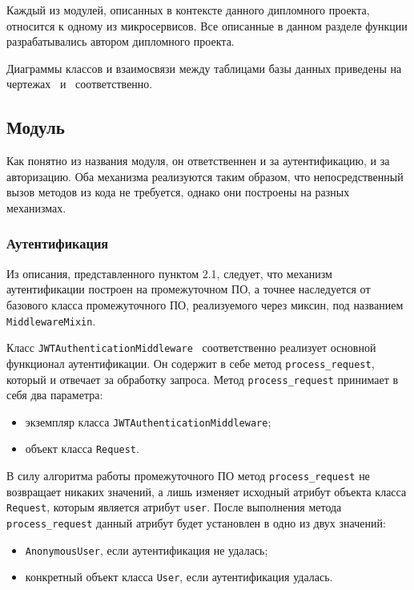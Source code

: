 Каждый из модулей, описанных в контексте данного дипломного проекта, относится к одному из микросервисов.
Все описанные в данном разделе функции разрабатывались автором дипломного проекта.

Диаграммы классов и взаимосвязи между таблицами базы данных приведены на чертежах \seqIcdScheme\ и \seqGooseScheme\ соответственно. %

\subsection{Модуль \moduleAuth}\label{subsec:func:module-auth}
Как понятно из названия модуля, он ответственнен и за аутентификацию, и за авторизацию.
Оба механизма реализуются таким образом, что непосредственный вызов методов из кода не требуется, однако они построены на разных механизмах.

\subsubsection{Аутентификация}
Из описания, представленного пунктом 2.1, следует, что механизм аутентификации построен на промежуточном ПО, а точнее наследуется
от базового класса промежуточного ПО, реализуемого через миксин, под названием \lstinline{MiddlewareMixin}. %

Класс \lstinline{JWTAuthenticationMiddleware} ~соответственно реализует основной функционал аутентификации.
Он содержит в себе метод \lstinline{process_request}, который и отвечает за обработку запроса.
Метод \lstinline{process_request} принимает в себя два параметра:
\begin{itemize}
    \item экземпляр класса \lstinline{JWTAuthenticationMiddleware};
    \item объект класса \lstinline{Request}.
\end{itemize}

В силу алгоритма работы промежуточного ПО метод \lstinline{process_request} не возвращает никаких значений,
а лишь изменяет исходный атрибут объекта класса \lstinline{Request}, которым является атрибут \lstinline{user}.
После выполнения метода \lstinline{process_request} данный атрибут будет установлен в одно из двух значений:
\begin{itemize}
    \item \lstinline{AnonymousUser}, если аутентификация не удалась;
    \item конкретный объект класса \lstinline{User}, если аутентификация удалась.
\end{itemize}

